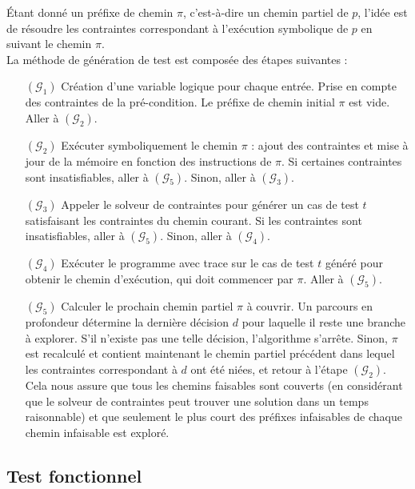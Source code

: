 Étant donné un préfixe de chemin $\pi$, c'est-à-dire un chemin partiel de $p$,
l'idée est de résoudre les contraintes correspondant à l'exécution symbolique
de $p$ en suivant le chemin $\pi$.\\
 
La méthode de génération de test est composée des étapes suivantes :

\begin{itemize}
\item[$(\mathcal{G}_1)$]
Création d'une variable logique pour chaque entrée.
Prise en compte des contraintes de la pré-condition.
Le préfixe de chemin initial $\pi$ est vide.
Aller à $(\mathcal{G}_2)$.

\item[$(\mathcal{G}_2)$]
Exécuter symboliquement le chemin $\pi$ : ajout des contraintes et
mise à jour de la mémoire en fonction des instructions de $\pi$.
Si certaines contraintes sont insatisfiables, aller à $(\mathcal{G}_5)$.
Sinon, aller à $(\mathcal{G}_3)$.

\item[$(\mathcal{G}_3)$]
Appeler le solveur de contraintes pour générer un cas de test $t$ satisfaisant
les contraintes du chemin courant. Si les contraintes sont insatisfiables, aller
à $(\mathcal{G}_5)$.
Sinon, aller à $(\mathcal{G}_4)$.

\item[$(\mathcal{G}_4)$]
Exécuter le programme avec trace sur le cas de test $t$ généré pour obtenir
le chemin d'exécution, qui doit commencer par $\pi$.
Aller à $(\mathcal{G}_5)$.

\item[$(\mathcal{G}_5)$]
Calculer le prochain chemin partiel $\pi$ à couvrir. Un parcours en profondeur
détermine la dernière décision $d$ pour laquelle il reste une branche à
explorer. S'il n'existe pas une telle décision, l'algorithme s'arrête. Sinon,
$\pi$ est recalculé et contient maintenant le chemin partiel précédent dans
lequel les contraintes correspondant à $d$ ont été niées, et retour à l'étape
$(\mathcal{G}_2)$. Cela nous assure que tous les chemins faisables sont couverts
(en considérant que le solveur de contraintes peut trouver une solution dans un
temps raisonnable) et que seulement le plus court des préfixes infaisables de
chaque chemin infaisable est exploré.
\end{itemize}



\subsection{Test fonctionnel}
\label{sec:test-fonctionnel}

